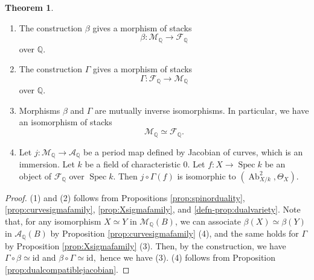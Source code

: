 \documentclass[autodetect-engine, a4paper]{amsart}
\theoremstyle{definition}
\newtheorem{thm}{Theorem}[section]
\def\Q{{\mathbb Q}}
\DeclareMathOperator\Ab{\mathrm{Ab}}
\DeclareMathOperator\Spec{\mathrm{Spec}}
\newcommand{\cora}{\color{black}}
\begin{document}
\begin{thm}
\label{thm:moduliarithmetictorelli}
\begin{enumerate}
\item
{\cora
The construction $\beta$ gives a morphism of stacks
\[
\beta \colon \mathcal{M}_{\Q} \rightarrow \mathcal{F}_{\Q}
\]
over $\Q$.
}
\item 
The construction $\Gamma$ gives a morphism of stacks
\[
\Gamma \colon \mathcal{F}_{\Q} \rightarrow \mathcal{M}_{\Q}
\]
over $\Q$.
\item 
Morphisms $\beta$ and $\Gamma$ are mutually inverse isomorphisms.
In particular, we have an isomorphism of stacks
\[
\mathcal{M}_{\Q} \simeq \mathcal{F}_{\Q}.
\]
\item
Let $j \colon \mathcal{M}_{\Q} \rightarrow \mathcal{A}_{\Q}$ be a period map defined by Jacobian of curves, which is an immersion.
Let $k$ be a field of characteristic $0$.
Let $f \colon X \rightarrow \Spec k$ be an object of $\mathcal{F}_{\Q}$ over $\Spec k$.
Then $j \circ \Gamma (f)$ is isomorphic to $(\Ab^{2}_{X/k}, \Theta_{X})$.
\end{enumerate}
\end{thm}

\begin{proof}
(1) and (2) follows from Propositions \ref{prop:spinorduality}, \ref{prop:curvesigmafamily}, \ref{prop:Xsigmafamily}, and \ref{defn-prop:dualvariety}.
{\cora Note that, for any isomorphism $X \simeq Y$ in $\mathcal{M}_{\Q} (B)$, we can associate $\beta (X) \simeq \beta (Y)$ in $\mathcal{A}_{\Q} (B)$ by Proposition \ref{prop:curvesigmafamily} (4), and the same holds for $\Gamma$ by Proposition \ref{prop:Xsigmafamily} (3).
}
{\cora Then, by the construction, we have}
$
\Gamma \circ \beta \simeq \mathrm{id}
$
and 
$
\beta \circ \Gamma \simeq \mathrm{id},
$
hence we have (3).
(4) follows from Proposition \ref{prop:dualcompatiblejacobian}. 
\end{proof}
\end{document}

